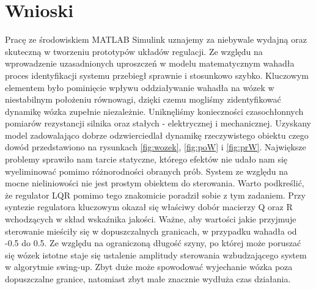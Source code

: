 \section{Wnioski}
Pracę ze środowiskiem MATLAB Simulink uznajemy za niebywale wydajną oraz skuteczną w tworzeniu prototypów układów regulacji. Ze względu na wprowadzenie uzasadnionych uproszczeń w modelu matematycznym wahadła proces identyfikacji systemu przebiegł sprawnie i stosunkowo szybko. Kluczowym elementem było pominięcie wpływu oddziaływanie wahadła na wózek w niestabilnym położeniu równowagi, dzięki czemu mogliśmy zidentyfikować dynamikę wózka zupełnie niezależnie. Uniknęliśmy konieczności czasochłonnych pomiarów rezystancji silnika oraz stałych - elektrycznej i mechanicznej. Uzyskany model zadowalająco dobrze odzwierciedlał dynamikę rzeczywistego obiektu czego dowód przedstawiono na rysunkach \ref{fig:wozek}, \ref{fig:poW} i \ref{fig:prW}. Największe problemy sprawiło nam tarcie statyczne, którego efektów nie udało nam się wyeliminować pomimo różnorodności obranych prób. System ze względu na mocne nieliniowości nie jest prostym obiektem do sterowania. Warto podkreślić, że regulator LQR pomimo tego znakomicie poradził sobie z tym zadaniem. Przy syntezie regulatora kluczowym okazał się właściwy dobór macierzy Q oraz R wchodzących w skład wskaźnika jakości. Ważne, aby wartości jakie przyjmuje sterowanie mieściły się w dopuszczalnych granicach, w przypadku wahadła od -0.5 do 0.5. Ze względu na ograniczoną długość szyny, po której może poruszać się wózek istotne staje się ustalenie amplitudy sterowania wzbudzającego system w algorytmie swing-up. Zbyt duże może spowodować wyjechanie wózka poza dopuszczalne granice, natomiast zbyt małe znacznie wydłuża czas działania.